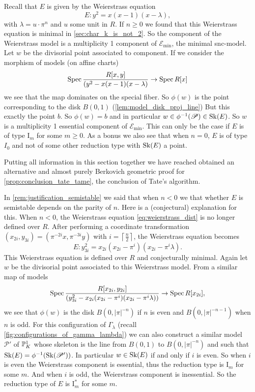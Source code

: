 Recall that $E$ is given by the Weierstrass equation 
\begin{equation}\label{eq:weierstrass_dist}
	E: y^2 = x(x-1)(x-\lambda)
,\end{equation}
with $\lambda = u \cdot \pi^{n}$ and $u$ some unit in $R$. 
If $n \ge 0$ we found that this Weierstrass equation is minimal in  \cref{sec:char_k_is_not_2}.
So the component of the Weierstrass model is a multiplicity 1 component of $\mathscr E_\text{min} $, the minimal snc-model. 
Let $w$ be the divisorial point associated to component.
If we consider the morphism of models (on affine charts) \[
	\operatorname{Spec} \frac{R[x, y]}{(y^2 - x(x-1)(x-\lambda)} \to \operatorname{Spec} R[x]
\]
we see that the map dominates on the special fiber. 
So $\phi(w)$ is the point corresponding to the disk $B(0, 1)$ (\cref{lem:model_disk_proj_line})
But this exactly the point $b$. So $\phi(w) = b$ and in particular $w \in \phi^{-1}(\mathscr P) \in \sk(E)$. 
So $w$ is a multiplicity 1 essential component of $\mathscr E_\text{min} $.
This can only be the case if $E$ is of type $\mathrm I_{m}$ for some $m \ge 0$. 
As a bonus we also see that when $n = 0$,  $E$ is of type $I_0$ and not of some other reduction type with $\operatorname{Sk}(E)$ a point. 

Putting all information in this section together we have reached obtained an alternative and almost purely Berkovich geometric proof for \cref{prop:conclusion_tate_tame}, the conclusion of Tate's algorithm. 
\medskip

In \cref{rem:justification_semistable} we said that when $n < 0$ we that whether $E$ is semistable depends on the parity of $n$. 
Here is a (conjectural) explanation for this. 
When $n < 0$, the Weierstrass equation \eqref{eq:weierstrass_dist} is no longer defined over $R$. 
After performing a coordinate transformation $(x_{2i}, y_{3i}) = (\pi^{-2i}x, \pi^{-3i}y)$ with $i = \left\lceil \frac{n}{2} \right\rceil $, the Weierstrass equation becomes \[
	E: y_{3i}^2 = x_{2i}(x_{2i}-\pi^{i})(x_{2i} - \pi^{i}\lambda)
.\] 
This Weierstrass equation is defined over $R$ and conjecturally minimal. 
Again let $w$ be the divisorial point associated to this Weierstrass model. 
From a similar map of models \[
	\operatorname{Spec} \frac{R[x_{2i}, y_{2i}]}{\left(y_{3i}^2 - x_{2i}(x_{2i}-\pi^{i})(x_{2i} - \pi^{i}\lambda)\right)} 
	\to \operatorname{Spec} R[x_{2i}]
,\] 
we see that $\phi(w)$ is the disk $B(0, |\pi|^{-n})$ if $n$ is even and $B(0,|\pi|^{-n-1}) $ when $n$ is odd. 
For this configuration of $\Gamma_\lambda$ (recall \cref{fig:configurations_of_gamma_lambda}) we can also construct a similar model $\mathscr P'$ of $\mathbb{P}^{1}_K$ whose skeleton is the line from $B(0, 1)$ to $B(0, |\pi|^{-n})$ and such that $\sk(E) = \phi^{-1}(\sk(\mathscr P'))$.
In particular $w \in \operatorname{Sk}(E)$  if and only if $i$ is even. 
So when $i$ is even the Weierstrass component is essential, thus the reduction type is $\mathrm I_m$ for some $m$. 
And when  $i$ is odd, the Weierstrass component is inessential. 
So the reduction type of $E$ is $\mathrm I_m^*$ for some $m$. 





